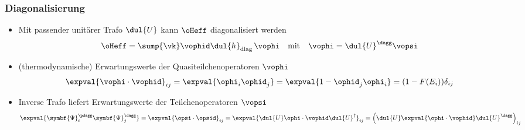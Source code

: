 \begin{frame}
    \frametitle{Diagonalisierung }
    \begin{itemize}
        \item Mit passender unitärer Trafo $\dul{U}$ kann $\oHeff$ diagonalisiert werden 
        \begin{align*}
            \oHeff &= \sump{\vk} \vophid \dul{h}_\text{diag} \, \vophi & \text{mit} & & \vophi &= \dul{U}^\dagg \vopsi
        \end{align*}
        \item (thermodynamische) Erwartungswerte der Quasiteilchenoperatoren $\vophi$
        \begin{align*}
            \expval{\vophi \cdot \vophid}_{ij} = \expval{\ophi_{i} \ophid_{j}} &= \expval{1 -\ophid_{j}  \ophi_{i}} = (1 - F(E_i))\delta_{ij}
        \end{align*}
        \item Inverse Trafo liefert Erwartungswerte der Teilchenoperatoren $\vopsi$
        \begin{align*}
            \expval{\symbf{\Psi}^{\pdagg}_i \symbf{\Psi}^{\dagg}_j} = \expval{\opsi \cdot \opsid}_{ij} = \expval{\dul{U} \ophi \cdot \vophid \dul{U}^\dagger}_{ij} = \left(\dul{U} \expval{\ophi \cdot \vophid} \dul{U}^\dagg\right)_{ij}
        \end{align*}
    \end{itemize}
\end{frame}

